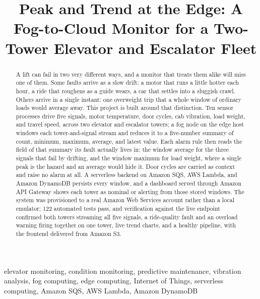 \documentclass[conference]{IEEEtran}
\begin{document}
\title{Peak and Trend at the Edge: A Fog-to-Cloud Monitor for a Two-Tower Elevator and Escalator Fleet}

\author{
}

\maketitle

\begin{abstract}
A lift can fail in two very different ways, and a monitor that treats them alike will miss one of them. Some faults arrive as a slow drift: a motor that runs a little hotter each hour, a ride that roughens as a guide wears, a car that settles into a sluggish crawl. Others arrive in a single instant: one overweight trip that a whole window of ordinary loads would average away. This project is built around that distinction. Ten sensor processes drive five signals, motor temperature, door cycles, cab vibration, load weight, and travel speed, across two elevator and escalator towers; a fog node on the edge host windows each tower-and-signal stream and reduces it to a five-number summary of count, minimum, maximum, average, and latest value. Each alarm rule then reads the field of that summary its fault actually lives in: the window average for the three signals that fail by drifting, and the window maximum for load weight, where a single peak is the hazard and an average would hide it. Door cycles are carried as context and raise no alarm at all. A serverless backend on Amazon SQS, AWS Lambda, and Amazon DynamoDB persists every window, and a dashboard served through Amazon API Gateway shows each tower as nominal or alerting from those stored windows. The system was provisioned to a real Amazon Web Services account rather than a local emulator; 122 automated tests pass, and verification against the live endpoint confirmed both towers streaming all five signals, a ride-quality fault and an overload warning firing together on one tower, live trend charts, and a healthy pipeline, with the frontend delivered from Amazon S3.
\end{abstract}

\begin{IEEEkeywords}
elevator monitoring, condition monitoring, predictive maintenance, vibration analysis, fog computing, edge computing, Internet of Things, serverless computing, Amazon SQS, AWS Lambda, Amazon DynamoDB
\end{IEEEkeywords}
\end{document}
